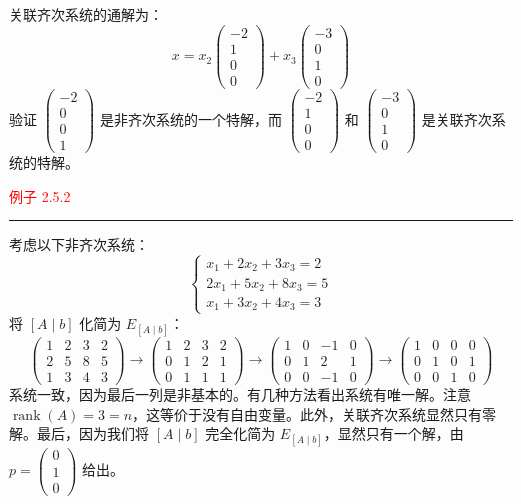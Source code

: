 关联齐次系统的通解为：
\[
x = x_{2} \begin{pmatrix} -2 \\ 1 \\ 0 \\ 0 \end{pmatrix} +
x_{3} \begin{pmatrix} -3 \\ 0 \\ 1 \\ 0 \end{pmatrix}
\]
验证 \(\begin{pmatrix} -2 \\ 0 \\ 0 \\ 1 \end{pmatrix}\) 是非齐次系统的一个特解，而 \(\begin{pmatrix} -2 \\ 1 \\ 0 \\ 0 \end{pmatrix}\) 和 \(\begin{pmatrix} -3 \\ 0 \\ 1 \\ 0 \end{pmatrix}\) 是关联齐次系统的特解。

\textcolor{red}{例子 2.5.2}
\color{red}\rule{\textwidth}{0.4pt}\color{black}

考虑以下非齐次系统：
\[
\begin{cases}
x_{1} + 2x_{2} + 3x_{3} = 2 \\
2x_{1} + 5x_{2} + 8x_{3} = 5 \\
x_{1} + 3x_{2} + 4x_{3} = 3
\end{cases}
\]
将 \([A \mid b]\) 化简为 \(E_{[A \mid b]}\)：
\[
\begin{pmatrix}
1 & 2 & 3 & 2 \\
2 & 5 & 8 & 5 \\
1 & 3 & 4 & 3
\end{pmatrix}
\rightarrow
\begin{pmatrix}
1 & 2 & 3 & 2 \\
0 & 1 & 2 & 1 \\
0 & 1 & 1 & 1
\end{pmatrix}
\rightarrow
\begin{pmatrix}
1 & 0 & -1 & 0 \\
0 & 1 & 2 & 1 \\
0 & 0 & -1 & 0
\end{pmatrix}
\rightarrow
\begin{pmatrix}
1 & 0 & 0 & 0 \\
0 & 1 & 0 & 1 \\
0 & 0 & 1 & 0
\end{pmatrix}
\]
系统一致，因为最后一列是非基本的。有几种方法看出系统有唯一解。注意 \(\operatorname{rank}(A) = 3 = n\)，这等价于没有自由变量。此外，关联齐次系统显然只有零解。最后，因为我们将 \([A \mid b]\) 完全化简为 \(E_{[A \mid b]}\)，显然只有一个解，由 \(p = \begin{pmatrix} 0 \\ 1 \\ 0 \end{pmatrix}\) 给出。

